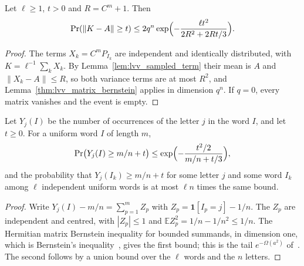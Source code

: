 \begin{lemma}
    \label{lem:lvv_sampled_accuracy}
    \leanok
    Let $\ell\ge1$, $t>0$ and $R=C^m+1$. Then
    \begin{align*}
        \Pr(\|K-A\|\ge t)\le2q^n\exp\Bigl(-\frac{\ell t^2}{2R^2+2Rt/3}\Bigr).
    \end{align*}
\end{lemma}

\begin{proof}
    \leanok
    The terms $X_k=C^mP_{I_k}$ are independent and identically distributed, with
    $K=\ell^{-1}\sum_kX_k$. By Lemma~\ref{lem:lvv_sampled_term} their mean is
    $A$ and $\|X_k-A\|\le R$, so both variance terms are at most $R^2$, and
    Lemma~\ref{thm:lvv_matrix_bernstein} applies in dimension $q^n$. If
    $q=0$, every matrix vanishes and the event is empty.
\end{proof}

\begin{lemma}
    \label{lem:lvv_letter_multiplicity}
    \leanok
    Let $Y_j(I)$ be the number of occurrences of the letter $j$ in the word $I$,
    and let $t\ge0$. For a uniform word $I$ of length $m$,
    \begin{align*}
        \Pr\bigl(Y_j(I)\ge m/n+t\bigr)
        \le\exp\Bigl(-\frac{t^2/2}{m/n+t/3}\Bigr),
    \end{align*}
    and the probability that $Y_j(I_k)\ge m/n+t$ for some letter $j$ and some
    word $I_k$ among $\ell$ independent uniform words is at most $\ell n$ times
    the same bound.
\end{lemma}

\begin{proof}
    \leanok
    Write $Y_j(I)-m/n=\sum_{p=1}^m Z_p$ with
    $Z_p=\mathbf 1[I_p=j]-1/n$. The $Z_p$ are independent and centred, with
    $|Z_p|\le1$ and $\mathbb EZ_p^2=1/n-1/n^2\le1/n$. The Hermitian matrix
    Bernstein inequality for bounded summands, in dimension one, which is
    Bernstein's inequality~\cite[Theorem~6.1]{Tropp2012User}, gives the first
    bound; this is the tail $e^{-\Omega(a^2)}$
    of~\cite[lines 646--648]{Landau2015Polynomial}. The second follows by a union
    bound over the $\ell$ words and the $n$ letters.
\end{proof}


